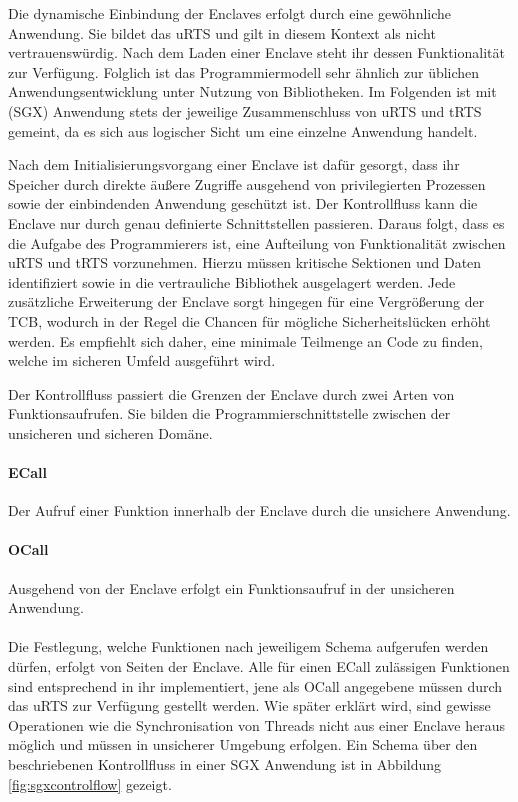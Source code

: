 Die dynamische Einbindung der Enclaves erfolgt durch eine gewöhnliche Anwendung. Sie bildet das \ac{uRTS} und gilt in diesem Kontext als nicht vertrauenswürdig. Nach dem Laden einer Enclave steht ihr dessen Funktionalität zur Verfügung. Folglich ist das Programmiermodell sehr ähnlich zur üblichen Anwendungsentwicklung unter Nutzung von Bibliotheken. Im Folgenden ist mit (\ac{SGX}) Anwendung stets der jeweilige Zusammenschluss von \ac{uRTS} und \ac{tRTS} gemeint, da es sich aus logischer Sicht um eine einzelne Anwendung handelt.

Nach dem Initialisierungsvorgang einer Enclave ist dafür gesorgt, dass ihr Speicher durch direkte äußere Zugriffe ausgehend von privilegierten Prozessen sowie der einbindenden Anwendung geschützt ist. Der Kontrollfluss kann die Enclave nur durch genau definierte Schnittstellen passieren. Daraus folgt, dass es die Aufgabe des Programmierers ist, eine Aufteilung von Funktionalität zwischen \ac{uRTS} und \ac{tRTS} vorzunehmen. Hierzu müssen kritische Sektionen und Daten identifiziert sowie in die vertrauliche Bibliothek ausgelagert werden. Jede zusätzliche Erweiterung der Enclave sorgt hingegen für eine Vergrößerung der \ac{TCB}, wodurch in der Regel die Chancen für mögliche Sicherheitslücken erhöht werden. Es empfiehlt sich daher, eine minimale Teilmenge an Code zu finden, welche im sicheren Umfeld ausgeführt wird. 

Der Kontrollfluss passiert die Grenzen der Enclave durch zwei Arten von Funktionsaufrufen. Sie bilden die Programmierschnittstelle zwischen der unsicheren und sicheren Domäne.

\paragraph{\ac{ECall}} Der Aufruf einer Funktion innerhalb der Enclave durch die unsichere Anwendung.

\paragraph{\ac{OCall}} Ausgehend von der Enclave erfolgt ein Funktionsaufruf in der unsicheren Anwendung.

\paragraph{}
Die Festlegung, welche Funktionen nach jeweiligem Schema aufgerufen werden dürfen, erfolgt von Seiten der Enclave. Alle für einen \ac{ECall} zulässigen Funktionen sind entsprechend in ihr implementiert, jene als \ac{OCall} angegebene müssen durch das uRTS zur Verfügung gestellt werden. Wie später erklärt wird, sind gewisse Operationen wie die Synchronisation von Threads nicht aus einer Enclave heraus möglich und müssen in unsicherer Umgebung erfolgen. Ein Schema über den beschriebenen Kontrollfluss in einer \ac{SGX} Anwendung ist in Abbildung \ref{fig:sgxcontrolflow} gezeigt.

